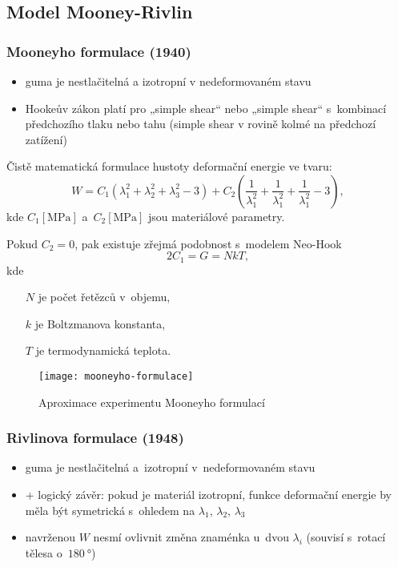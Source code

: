 
\subsection{Model Mooney-Rivlin}\label{sec:mooney-rivlin}
\subsubsection{Mooneyho formulace (1940)}\label{subsec:mooneyho-formulace}
\begin{itemize}
	\item guma je nestlačitelná a izotropní v nedeformovaném stavu
	\item Hookeův zákon platí pro „simple shear“ nebo „simple shear“ s~kombinací předchozího tlaku nebo tahu (simple shear v rovině kolmé na předchozí zatížení) 
\end{itemize}

Čistě matematická formulace hustoty deformační energie ve tvaru:
\begin{equation}
	W = C_1  \left(\lambda_1^2 + \lambda_2^2 + \lambda_3^2 - 3\right) + C_2 \left(\frac{1}{\lambda_1^2} + \frac{1}{\lambda_1^2} + \frac{1}{\lambda_1^2} - 3\right),
\end{equation}
kde $C_1 [\si{\mega\pascal}]$ a~$C_2 [\si{\mega\pascal}]$ jsou materiálové parametry.

Pokud $C_2 = 0$, pak existuje zřejmá podobnost s~modelem Neo-Hook
\begin{equation}
	2 C_1 = G = N k T,
\end{equation}
kde
\begin{itemize}
	\item[$N$] je počet řetězců v~objemu,
	\item[$k$] je Boltzmanova konstanta,
	\item[$T$] je termodynamická teplota.
\end{itemize}

\begin{figure}[H]
	\centering
	\texttt{[image: mooneyho-formulace]}
	\caption{Aproximace experimentu Mooneyho formulací}
	\label{fig:mooneyho-formulace}
\end{figure}

\subsubsection{Rivlinova formulace (1948)}\label{subsec:rivlinova-formulace}
\begin{itemize}
	\item guma je nestlačitelná a~izotropní v~nedeformovaném stavu
	\item + logický závěr: pokud je materiál izotropní, funkce deformační energie by měla být symetrická s~ohledem na $\lambda_1$, $\lambda_2$, $\lambda_3$
	\item navrženou $W$ nesmí ovlivnit změna znaménka u~dvou $\lambda_i$ (souvisí s~rotací tělesa o~$\SI{180}{\degree}$)
\end{itemize}


